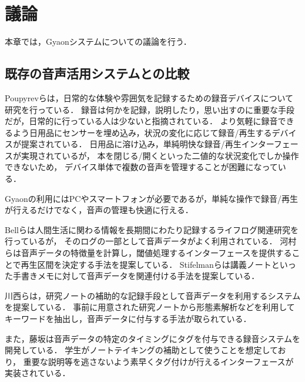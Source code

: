 \chapter{議論}
\label{chap:discussion}

本章では，Gyaonシステムについての議論を行う．

\newpage


\section{既存の音声活用システムとの比較}


Poupyrevらは，日常的な体験や雰囲気を記録するための録音デバイスについて研究を行っている\cite{Poupyrev}．
録音は何かを記録，説明したり，思い出すのに重要な手段だが，日常的に行っている人は少ないと指摘されている．
より気軽に録音できるよう日用品にセンサーを埋め込み，状況の変化に応じて録音/再生するデバイスが提案されている．
日用品に溶け込み，単純明快な録音/再生インターフェースが実現されているが，
本を閉じる/開くといった二値的な状況変化でしか操作できないため，
デバイス単体で複数の音声を管理することが困難になっている．

Gyaonの利用にはPCやスマートフォンが必要であるが，単純な操作で録音/再生が行えるだけでなく，音声の管理も快適に行える．

\vspace{0.25in}

Bellらは人間生活に関わる情報を長期間にわたり記録するライフログ関連研究を行っている\cite{Bell}が，
そのログの一部として音声データがよく利用されている．
河村らは音声データの特徴量を計算し，閾値処理するインターフェースを提供することで再生区間を決定する手法を提案している\cite{Kawamura}．
Stifelmanらは講義ノートといった手書きメモに対して音声データを関連付ける手法を提案している\cite{Stifelman}．

川西らは，研究ノートの補助的な記録手段として音声データを利用するシステムを提案している\cite{Kawanishi}．
事前に用意された研究ノートから形態素解析などを利用してキーワードを抽出し，音声データに付与する手法が取られている．

また，藤坂は音声データの特定のタイミングにタグを付与できる録音システムを開発している\cite{Fujisaka}．
学生がノートテイキングの補助として使うことを想定しており，
重要な説明等を逃さないよう素早くタグ付けが行えるインターフェースが実装されている．

